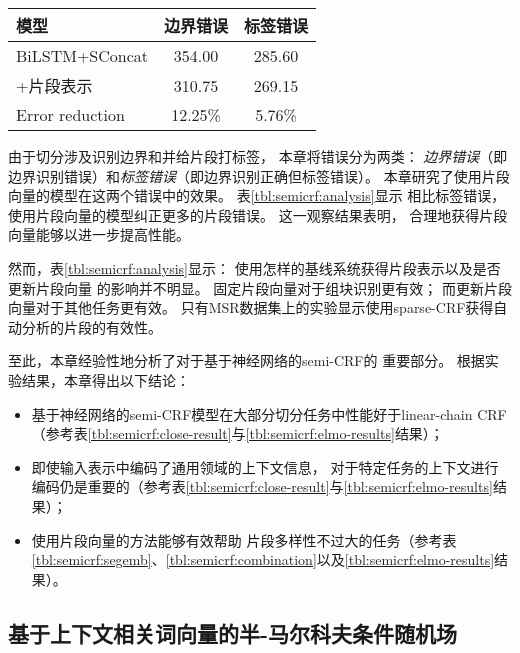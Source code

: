 \begin{table}[!t]
	\vspace{0.5em}\centering\wuhao
	\begin{tabular}{l cc}
		\toprule[1.5pt]
		模型 & 边界错误 & 标签错误 \\
		\midrule[1pt]
		BiLSTM+SConcat & 354.00 & 285.60 \\
		\quad +片段表示 & 310.75 & 269.15 \\
		Error reduction & 12.25\% & 5.76\% \\
		\bottomrule[1.5pt]
	\end{tabular}
\end{table}

由于切分涉及识别边界和并给片段打标签，
本章将错误分为两类：
\textit{边界错误}（即边界识别错误）和\textit{标签错误}（即边界识别正确但标签错误）。
本章研究了使用片段向量的模型在这两个错误中的效果。 
表\ref{tbl:semicrf:analysis}显示
相比标签错误，使用片段向量的模型纠正更多的片段错误。
这一观察结果表明，
合理地获得片段向量能够以进一步提高性能。

然而，表\ref{tbl:semicrf:analysis}显示：
使用怎样的基线系统获得片段表示以及是否更新片段向量
的影响并不明显。
固定片段向量对于组块识别更有效；
而更新片段向量对于其他任务更有效。
只有MSR数据集上的实验显示使用sparse-CRF获得自动分析的片段的有效性。

至此，本章经验性地分析了对于基于神经网络的semi-CRF的
重要部分。
根据实验结果，本章得出以下结论：
\begin{itemize}
	\item 基于神经网络的semi-CRF模型在大部分切分任务中性能好于linear-chain CRF（参考表\ref{tbl:semicrf:close-result}与\ref{tbl:semicrf:elmo-results}结果）；
	\item 即使输入表示中编码了通用领域的上下文信息，
	对于特定任务的上下文进行编码仍是重要的（参考表\ref{tbl:semicrf:close-result}与\ref{tbl:semicrf:elmo-results}结果）；
	\item 使用片段向量的方法能够有效帮助
	片段多样性不过大的任务（参考表\ref{tbl:semicrf:segemb}、\ref{tbl:semicrf:combination}以及\ref{tbl:semicrf:elmo-results}结果）。
\end{itemize}

\subsection{基于上下文相关词向量的半-马尔科夫条件随机场}

